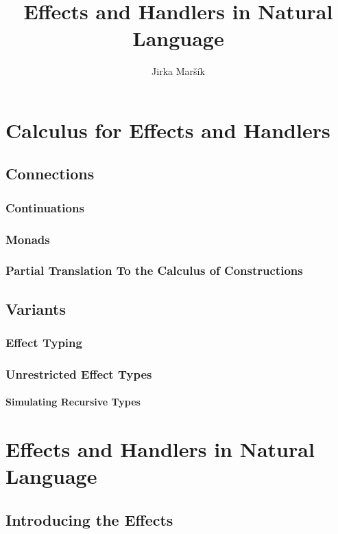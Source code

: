 \documentclass{report}
\title{Effects and Handlers in Natural Language}
\author{Jirka Maršík}
\begin{document}
\maketitle

\tableofcontents

\part{Calculus for Effects and Handlers}





\chapter{Connections}
\section{Continuations}
\section{Monads}
\section{Partial Translation To the Calculus of Constructions}

\chapter{Variants}
\section{Effect Typing}
\section{Unrestricted Effect Types}
\subsection{Simulating Recursive Types}



\part{Effects and Handlers in Natural Language}

\chapter{Introducing the Effects}
\end{document}
